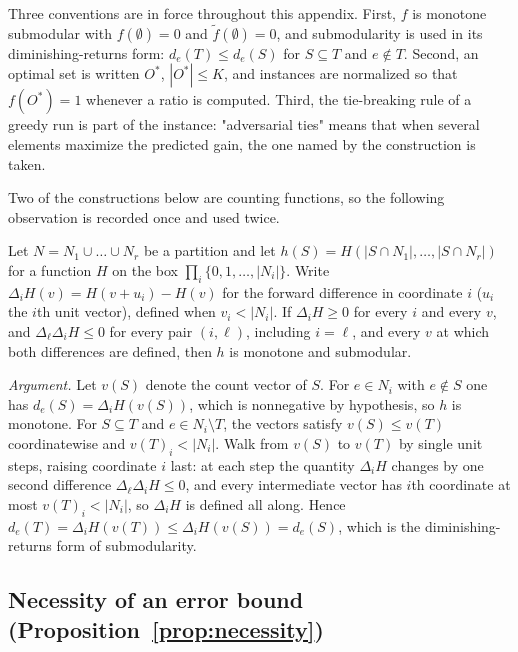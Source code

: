 Three conventions are in force throughout this appendix.  First, $f$ is
monotone submodular with $f(\emptyset)=0$ and $\tilde f(\emptyset)=0$, and
submodularity is used in its diminishing-returns form: $d_e(T)\le d_e(S)$ for
$S\subseteq T$ and $e\notin T$.  Second, an optimal set is written $O^{\ast}$,
$|O^{\ast}|\le K$, and instances are normalized so that $f(O^{\ast})=1$
whenever a ratio is computed.  Third, the tie-breaking rule of a greedy run is
part of the instance: "adversarial ties" means that when several elements
maximize the predicted gain, the one named by the construction is taken.

Two of the constructions below are counting functions, so the following
observation is recorded once and used twice.

\begin{lemma}\label{lem:app-count}
Let $N=N_1\cup\dots\cup N_r$ be a partition and let
$h(S)=H(|S\cap N_1|,\dots,|S\cap N_r|)$ for a function $H$ on the box
$\prod_{i}\{0,1,\dots,|N_i|\}$.  Write $\Delta_i H(v)=H(v+u_i)-H(v)$ for the
forward difference in coordinate $i$ ($u_i$ the $i$th unit vector), defined
when $v_i<|N_i|$.  If $\Delta_iH\ge0$ for every $i$ and every $v$, and
$\Delta_\ell\Delta_iH\le0$ for every pair $(i,\ell)$, including $i=\ell$, and
every $v$ at which both differences are defined, then $h$ is monotone and
submodular.
\end{lemma}

\noindent
\emph{Argument.}  Let $v(S)$ denote the count vector of $S$.  For $e\in N_i$
with $e\notin S$ one has $d_e(S)=\Delta_iH(v(S))$, which is nonnegative by
hypothesis, so $h$ is monotone.  For $S\subseteq T$ and $e\in N_i\setminus T$,
the vectors satisfy $v(S)\le v(T)$ coordinatewise and $v(T)_i<|N_i|$.  Walk
from $v(S)$ to $v(T)$ by single unit steps, raising coordinate $i$ last: at
each step the quantity $\Delta_iH$ changes by one second difference
$\Delta_\ell\Delta_iH\le0$, and every intermediate vector has $i$th coordinate
at most $v(T)_i<|N_i|$, so $\Delta_iH$ is defined all along.  Hence
$d_e(T)=\Delta_iH(v(T))\le\Delta_iH(v(S))=d_e(S)$, which is the
diminishing-returns form of submodularity.

\subsection{Necessity of an error bound (Proposition~\ref{prop:necessity})}
\label{app:necessity}

